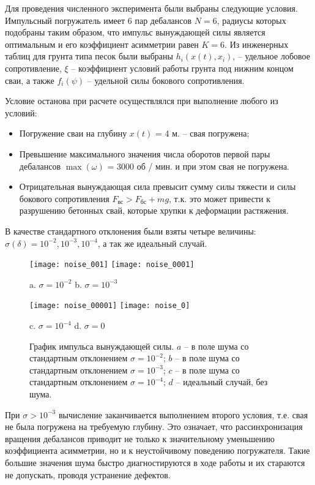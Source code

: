 Для проведения численного эксперимента были выбраны следующие условия. Импульсный погружатель имеет 6 пар дебалансов $N=6$,
радиусы которых подобраны таким образом, что импульс вынуждающей силы является оптимальным и его коэффициент асимметрии равен $K=6$.
Из инженерных таблиц для грунта типа песок были выбраны $h_i(x(t),x_i)$, – удельное лобовое сопротивление, $\xi$ – коэффициент
условий работы грунта под нижним концом сваи, а также $f_i(\psi)$ – удельной силы бокового сопротивления.

Условие останова при расчете осуществлялся при выполнение любого из условий:
\begin{itemize}
    \item Погружение сваи на глубину $x(t)$ = 4 м. -- свая погружена;
    \item Превышение максимального значения числа оборотов первой пары дебалансов $\max(\omega)$ = 3000 об / мин.
    и при этом свая не погружена.
    \item Отрицательная вынуждающая сила превысит сумму силы тяжести и силы бокового сопротивления $F_\text{вс} > F_\text{бс} + mg $,
    т.к. это может привести к разрушению бетонных свай, которые хрупки к деформации растяжения.
\end{itemize}
В качестве стандартного отклонения были взяты четыре величины: $\sigma(\delta) = 10^{-2}, 10^{-3}, 10^{-4}$, а так же идеальный случай.

\begin{figure}[ht]
    \centering
    \texttt{[image: noise\_001]}
    \texttt{[image: noise\_0001]}

    a. $\sigma = 10^{-2}$ \hspace{5cm} b. $\sigma = 10^{-3}$

    \texttt{[image: noise\_00001]}
    \texttt{[image: noise\_0]}

    c. $\sigma = 10^{-4}$ \hspace{5cm} d. $\sigma = 0$
    \caption{График импульса вынуждающей силы.
    $a$ -- в поле шума со стандартным отклонением $\sigma = 10^{-2}$;
    $b$ -- в поле шума со стандартным отклонением $\sigma = 10^{-3}$;
    $c$ -- в поле шума со стандартным отклонением $\sigma = 10^{-4}$;
    $d$ -- идеальный случай, без шума.}
    \label{fig:impulse-noise}
\end{figure}

При $\sigma > 10^{-3}$ вычисление заканчивается выполнением второго условия, т.е. свая не была погружена на требуемую глубину.
Это означает, что рассинхронизация вращения дебалансов приводит не только к значительному уменьшению коэффициента асимметрии,
но и к неустойчивому поведению погружателя. Такие большие значения шума быстро диагностируются в ходе работы и их стараются не
допускать, проводя устранение дефектов.

